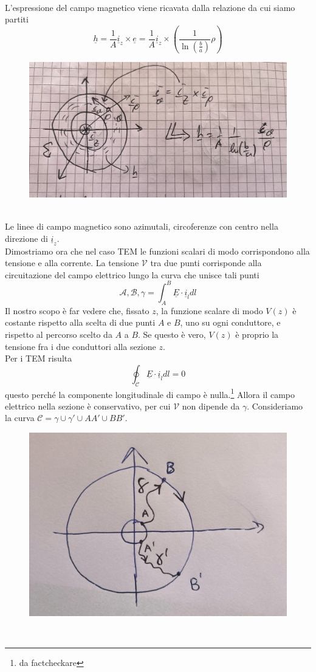 \documentclass{book}
\begin{document}
        \\ L'espressione del campo magnetico viene ricavata dalla relazione da cui siamo partiti
        \begin{equation}
        \underline{h} = \frac{1}{A} \underline{i}_{z} \times \underline{e} = \frac{1}{A} \underline{i}_{z} \times (\frac{1}{\ln (\frac{b}{a})}\rho)
        \end{equation}
        \begin{figure}[h!]
        \center  
        \includegraphics[width=0.5\linewidth]{img/Chapter_three/Chapter3img10.png}
        \end{figure} \\
        Le linee di campo magnetico sono azimutali, circoferenze con centro nella direzione di $\underline{i}_{z}$. \\
        Dimostriamo ora che nel caso TEM le funzioni scalari di modo corrispondono alla tensione e alla corrente.
        La tensione $\mathcal{V}$ tra due punti corrisponde alla circuitazione del campo elettrico lungo la curva che unisce tali punti
        \begin{equation}
        \mathcal{A, B, \gamma} = \int_{A} ^{B} \underline{E} \cdot \underline{i}_{l} dl
        \end{equation}
        Il nostro scopo è far vedere che, fissato $z$, la funzione scalare di modo $V(z)$ è costante rispetto alla scelta di 
        due punti $A$ e $B$, uno su ogni conduttore, e rispetto al percorso scelto da $A$ a $B$. Se questo è vero, $V(z)$ è proprio la 
        tensione fra i due conduttori alla sezione $z$. \\
        Per i TEM risulta
        \begin{equation}
        \oint_{\mathcal{C}} \underline{E} \cdot \underline{i}_{l} dl = 0
        \end{equation}
        questo perché la componente longitudinale di campo è nulla.\footnote{da factcheckare} Allora il campo elettrico nella sezione è
        conservativo, per cui $\mathcal{V}$ non dipende da $\gamma$. Consideriamo la curva $\mathcal{C} = \gamma \cup \gamma ' \cup AA' \cup BB'$.
        \begin{figure}[h!]
        \center  
        \includegraphics[width=0.5\linewidth]{img/Chapter_three/Chapter3img11.png}
        \end{figure} \\
\end{document}
